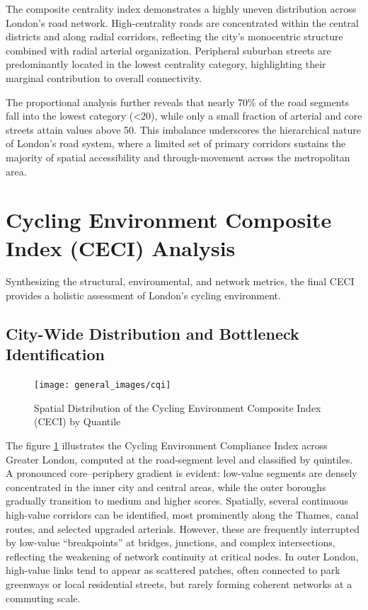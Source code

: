 \documentclass[
  12pt,
  oneside]{book}
\begin{document}
The composite centrality index demonstrates a highly uneven distribution across London's road network. High-centrality roads are concentrated within the central districts and along radial corridors, reflecting the city's monocentric structure combined with radial arterial organization. Peripheral suburban streets are predominantly located in the lowest centrality category, highlighting their marginal contribution to overall connectivity.

The proportional analysis further reveals that nearly 70\% of the road segments fall into the lowest category (\textless20), while only a small fraction of arterial and core streets attain values above 50. This imbalance underscores the hierarchical nature of London's road system, where a limited set of primary corridors sustains the majority of spatial accessibility and through-movement across the metropolitan area.

\section{Cycling Environment Composite Index (CECI) Analysis}\label{cycling-environment-composite-index-ceci-analysis}

Synthesizing the structural, environmental, and network metrics, the final CECI provides a holistic assessment of London's cycling environment.

\subsection{City-Wide Distribution and Bottleneck Identification}\label{city-wide-distribution-and-bottleneck-identification}

\begin{figure}

{\centering \texttt{[image: general\_images/cqi]} 

}

\caption{Spatial Distribution of the Cycling Environment Composite Index (CECI) by Quantile}\label{fig:cqi}
\end{figure}

The figure \ref{fig:cqi} illustrates the Cycling Environment Compliance Index across Greater London, computed at the road-segment level and classified by quintiles. A pronounced core--periphery gradient is evident: low-value segments are densely concentrated in the inner city and central areas, while the outer boroughs gradually transition to medium and higher scores. Spatially, several continuous high-value corridors can be identified, most prominently along the Thames, canal routes, and selected upgraded arterials. However, these are frequently interrupted by low-value ``breakpoints'' at bridges, junctions, and complex intersections, reflecting the weakening of network continuity at critical nodes. In outer London, high-value links tend to appear as scattered patches, often connected to park greenways or local residential streets, but rarely forming coherent networks at a commuting scale.
\end{document}
